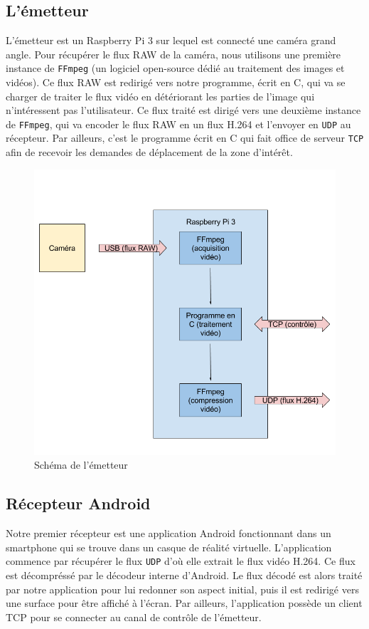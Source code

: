 \documentclass[11pt,a4paper]{article}
\begin{document}
\subsection{L'émetteur}
L'émetteur est un Raspberry Pi 3 sur lequel est connecté une caméra grand angle.
Pour récupérer le flux RAW de la caméra, nous utilisons une première instance de \texttt{FFmpeg} (un logiciel open-source dédié au traitement des images et vidéos).
Ce flux RAW est redirigé vers notre programme, écrit en C, qui va se charger de traiter le flux vidéo en détériorant les parties de l'image qui n'intéressent pas l'utilisateur.
Ce flux traité est dirigé vers une deuxième instance de \texttt{FFmpeg}, qui va encoder le flux RAW en un flux H.264 et l'envoyer en \texttt{UDP} au récepteur.
Par ailleurs, c'est le programme écrit en C qui fait office de serveur \texttt{TCP} afin de recevoir les demandes de déplacement de la zone d'intérêt.

\bigbreak
\begin{figure}[H]
\begin{center}
\includegraphics[scale=0.35]{images/schema_emetteur.png}
\end{center}
\caption{Schéma de l'émetteur}
\label{}
\end{figure}
\bigbreak

\subsection{Récepteur Android}
Notre premier récepteur est une application Android fonctionnant dans un smartphone qui se trouve dans un casque de réalité virtuelle.
L'application commence par récupérer le flux \texttt{UDP} d'où elle extrait le flux vidéo H.264.
Ce flux est décompréssé par le décodeur interne d'Android.
Le flux décodé est alors traité par notre application pour lui redonner son aspect initial, puis il est redirigé vers une surface pour être affiché à l'écran.
Par ailleurs, l'application possède un client TCP pour se connecter au canal de contrôle de l'émetteur.
\end{document}
